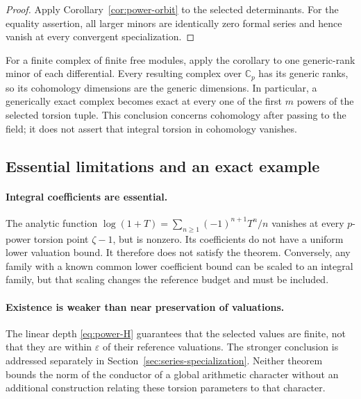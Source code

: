 \begin{proof}
Apply Corollary~\ref{cor:power-orbit} to the selected determinants. For
the equality assertion, all larger minors are identically zero formal
series and hence vanish at every convergent specialization.
\end{proof}

For a finite complex of finite free modules, apply the corollary to one
generic-rank minor of each differential. Every resulting complex over
$\mathbb C_p$ has its generic ranks, so its cohomology dimensions are the
generic dimensions. In particular, a generically exact complex becomes
exact at every one of the first $m$ powers of the selected torsion tuple.
This conclusion concerns cohomology after passing to the field; it does
not assert that integral torsion in cohomology vanishes.

\subsection{Essential limitations and an exact example}

\paragraph{Integral coefficients are essential.}
The analytic function $\log(1+T)=\sum_{n\geq1}(-1)^{n+1}T^n/n$
vanishes at every $p$-power torsion point $\zeta-1$, but is nonzero.
Its coefficients do not have a uniform lower valuation bound. It therefore
does not satisfy the theorem. Conversely, any family with a known common
lower coefficient bound can be scaled to an integral family, but that
scaling changes the reference budget and must be included.

\paragraph{Existence is weaker than near preservation of valuations.}
The linear depth \eqref{eq:power-H} guarantees that the selected values
are finite, not that they are within $\varepsilon$ of their reference
valuations. The stronger conclusion is addressed separately in
Section~\ref{sec:series-specialization}. Neither theorem bounds the norm of
the conductor of a global arithmetic character without an additional
construction relating these torsion parameters to that character.

